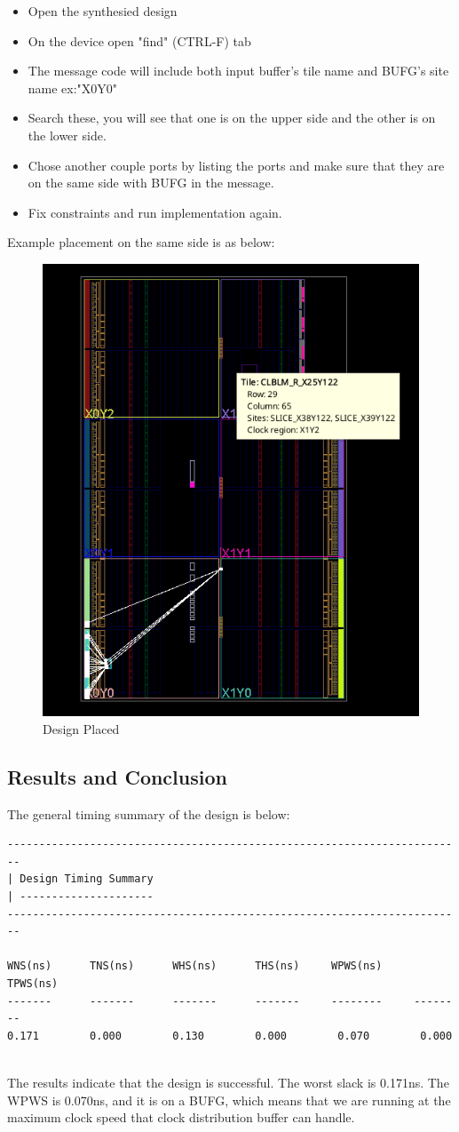 \documentclass{report}
\begin{document}
\begin{itemize}
    \item Open the synthesied design
    \item On the device open "find" (CTRL-F) tab
    \item The message code will include both input buffer's tile name and BUFG's site name ex:"X0Y0"
    \item Search these, you will see that one is on the upper side and the other is on the lower side.
    \item Chose another couple ports by listing the ports and make sure that they are on the same side with BUFG in the message.
    \item Fix constraints and run implementation again.
\end{itemize}
Example placement on the same side is as below:
\begin{figure}[ht]
    \includegraphics[width=0.6\linewidth]{images/ibufg_placement.png}
    \centering
    \caption{Design Placed}
    \label{fig:ibuf_plc}
\end{figure}
\pagebreak
\subsection{Results and Conclusion}
The general timing summary of the design is below:
\begin{verbatim}
------------------------------------------------------------------------
| Design Timing Summary
| ---------------------
------------------------------------------------------------------------

WNS(ns)      TNS(ns)      WHS(ns)      THS(ns)     WPWS(ns)     TPWS(ns)  
-------      -------      -------      -------     --------     --------  
0.171        0.000        0.130        0.000        0.070        0.000  
    
\end{verbatim}

The results indicate that the design is successful. The worst slack is 0.171ns. The WPWS is 0.070ns, and it is on a BUFG, which means that we are running at the maximum clock speed that clock distribution buffer can handle.
\end{document}
